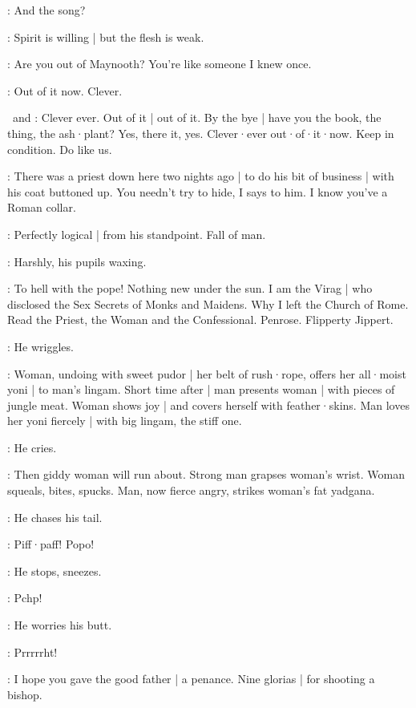 \Florry:
And the song?

\Stephen:
Spirit is willing |
but the flesh is weak.

\Florry:
Are you out of Maynooth?
You're like someone I knew once.

\Stephen:
Out of it now.
Clever.


\PhilipDrunk\ and \PhilipSober:
Clever ever.
Out of it |
out of it.
By the bye |
have you the book,
the thing,
the ash·plant?
Yes,
there it,
yes.
Clever·ever out·of·it·now.
Keep in condition.
Do like us.

\Zoe:
There was a priest down here two nights ago |
to do his bit of business |
with his coat buttoned up.
You needn't try to hide,
I says to him.
I know you've a Roman collar.

\Virag:
Perfectly logical |
from his standpoint.
Fall of man.

:
Harshly,
his pupils waxing.

\Virag:
To hell with the pope!
Nothing new under the sun.
I am the Virag |
who disclosed the Sex Secrets of Monks and Maidens.
Why I left the Church of Rome.
Read the Priest,
the Woman and the Confessional.
Penrose.
Flipperty Jippert.

:
He wriggles.

\Virag:
Woman,
undoing with sweet pudor |
her belt of rush·rope,
offers her all·moist yoni |
to man's lingam.
Short time after |
man presents woman |
with pieces of jungle meat.
Woman shows joy |
and covers herself with feather·skins.
Man loves her yoni fiercely |
with big lingam,
the stiff one.

:
He cries.

\Virag:
Then giddy woman will run about.
Strong man grapses woman's wrist.
Woman squeals,
bites,
spucks.
Man,
now fierce angry,
strikes woman's fat yadgana.

:
He chases his tail.

\Virag:
Piff·paff!
Popo!

:
He stops,
sneezes.

\Virag:
Pchp!

:
He worries his butt.

\Virag:
Prrrrrht!

\Lynch[2]:
I hope you gave the good father |
a penance.
Nine glorias |
for shooting a bishop.

